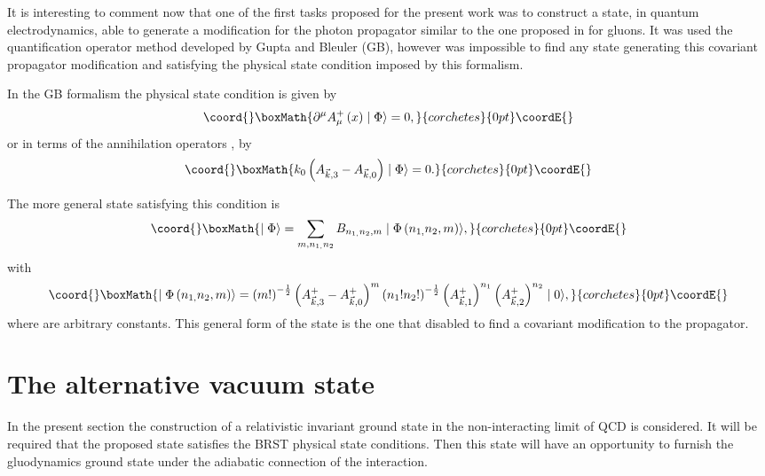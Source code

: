 \documentclass[12pt,letterpaper]{report}
\begin{document}
It is interesting to comment now that one of the first tasks
proposed for the present work was to construct a state, in quantum
electrodynamics, able to generate a modification for the photon
propagator similar to the one proposed in \cite{Cabo} for gluons.
It was used the quantification operator method developed by Gupta
and Bleuler (GB), however was impossible to find any state
generating this covariant propagator modification and satisfying
the physical state condition imposed by this formalism.

In the GB formalism the physical state condition is given by
\[\coord{}\boxMath{
\partial ^\mu A_\mu ^{+}\left(x\right) \mid \Phi \rangle =0,
}{corchetes}{0pt}\coordE{}\]
or in terms of the annihilation operators \cite{Sokolov}, by
\[\coord{}\boxMath{
k_0\left(A_{\vec{k},3}-A_{\vec{k},0}\right) \mid \Phi \rangle =0.
}{corchetes}{0pt}\coordE{}\]

The more general state satisfying this condition is
\cite{GuptaTex}
\[\coord{}\boxMath{
\mid \Phi \rangle =\sum\limits_{m,n_{1,}n_2}B_{n_{1,}n_2,m}\mid
\Phi \left(n_{1,}n_2,m\right) \rangle,
}{corchetes}{0pt}\coordE{}\]
with
\[\coord{}\boxMath{
\mid \Phi \left(n_{1,}n_2,m\right) \rangle =\left(m!\right)
^{-\frac 12}\left(A_{\vec{k},3}^{+}-A_{\vec{k},0}^{+}\right)
^m\left(n_1!n_2!\right) ^{-\frac 12}\left(
A_{\vec{k},1}^{+}\right) ^{n_1}\left(A_{ \vec{k},2}^{+}\right)
^{n_2}\mid 0\rangle,
}{corchetes}{0pt}\coordE{}\]
where \coordHE{} are arbitrary constants. This general form
of the state is the one that disabled to find a covariant
modification to the propagator.

\section{The alternative vacuum state}

In the present section the construction of a relativistic
invariant ground state in the non-interacting limit of QCD is
considered. It will be required that the proposed state satisfies
the BRST physical state conditions. Then this state will have an
opportunity to furnish the gluodynamics ground state under the
adiabatic connection of the interaction.
\end{document}

